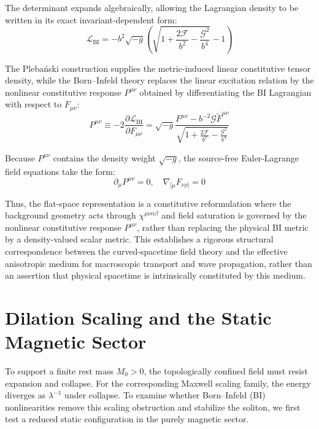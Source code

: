\documentclass[11pt,a4paper]{article}
\begin{document}
The determinant expands algebraically, allowing the Lagrangian density to be written in its exact invariant-dependent form:
\begin{equation}
\mathcal{L}_{\text{BI}} = -b^2 \sqrt{-g} \left(\sqrt{1 + \frac{2\mathcal{F}}{b^2} - \frac{\mathcal{G}^2}{b^4}} - 1\right)
\end{equation}

The Pleba\'{n}ski construction supplies the metric-induced linear constitutive tensor density, while the Born--Infeld theory replaces the linear excitation relation by the nonlinear constitutive response $P^{\mu\nu}$ obtained by differentiating the BI Lagrangian with respect to $F_{\mu\nu}$:
\begin{equation}
P^{\mu\nu} \equiv -2\frac{\partial \mathcal{L}_{\text{BI}}}{\partial F_{\mu\nu}} = \sqrt{-g} \frac{F^{\mu\nu} - b^{-2}\mathcal{G}\tilde{F}^{\mu\nu}}{\sqrt{1 + \frac{2\mathcal{F}}{b^2} - \frac{\mathcal{G}^2}{b^4}}}
\end{equation}

Because $P^{\mu\nu}$ contains the density weight $\sqrt{-g}$, the source-free Euler-Lagrange field equations take the form:
\begin{equation}
\partial_\mu P^{\mu\nu} = 0, \quad \nabla_{[\mu} F_{\nu\rho]} = 0
\end{equation}

Thus, the flat-space representation is a constitutive reformulation where the background geometry acts through $\chi^{\mu\nu\alpha\beta}$ and field saturation is governed by the nonlinear constitutive response $P^{\mu\nu}$, rather than replacing the physical BI metric by a density-valued scalar metric. This establishes a rigorous structural correspondence between the curved-spacetime field theory and the effective anisotropic medium for macroscopic transport and wave propagation, rather than an assertion that physical spacetime is intrinsically constituted by this medium.

\section{Dilation Scaling and the Static Magnetic Sector}
To support a finite rest mass $M_0 > 0$, the topologically confined field must resist expansion and collapse. For the corresponding Maxwell scaling family, the energy diverges as $\lambda^{-1}$ under collapse. To examine whether Born--Infeld (BI) nonlinearities remove this scaling obstruction and stabilize the soliton, we first test a reduced static configuration in the purely magnetic sector.
\end{document}
